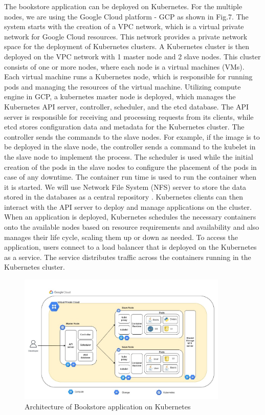 The bookstore application can be deployed on Kubernetes. For the multiple nodes, we are using the Google Cloud platform - GCP as shown in Fig.7. The system starts with the creation of a VPC network, which is a virtual private network for Google Cloud resources. This network provides a private network space for the deployment of Kubernetes clusters. A Kubernetes cluster is then deployed on the VPC network with 1 master node and 2 slave nodes. This cluster consists of one or more nodes, where each node is a virtual machines (VMs). Each virtual machine runs a Kubernetes node, which is responsible for running pods and managing the resources of the virtual machine. Utilizing compute engine in GCP, a kubernetes master node is  deployed, which manages the Kubernetes API server, controller, scheduler, and the etcd database. The API server is responsible for receiving and processing requests from its clients, while etcd stores configuration data and metadata for the Kubernetes cluster. The controller sends the commands to the slave nodes.  For example, if the image is to be deployed in the slave node, the controller sends a command to the kubelet in the slave node to implement the process. The scheduler is used while the initial creation of the pods in the slave nodes to configure the placement of the pods in case of any downtime. The container run time is used to run the container when it is started. We will use Network File System (NFS) server to store the data stored in the databases as a central repository . Kubernetes clients can then interact with the API server to deploy and manage applications on the cluster. When an application is deployed, Kubernetes schedules the necessary containers onto the available nodes based on resource requirements and availability and also manages their life cycle, scaling them up or down as needed. To access the application, users connect to a load balancer that is deployed on the Kubernetes  as a service. The service distributes traffic across the containers running in the Kubernetes cluster.

\begin{figure}
    \centering
    \includegraphics[width=10cm, height=6.2cm]{images/Kubernetes_architecture.jpg}
    \caption{Architecture of Bookstore application on Kubernetes}
    \label{fig:my_label}
\end{figure}
